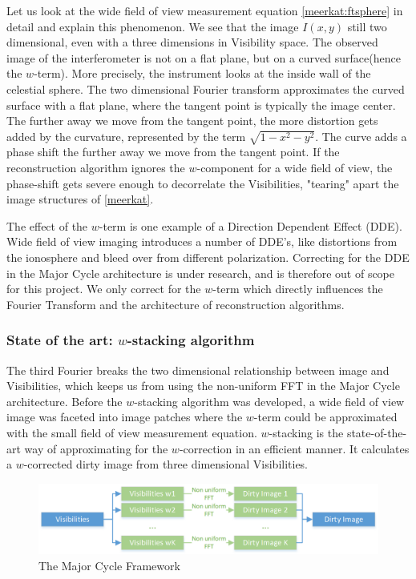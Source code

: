 Let us look at the wide field of view measurement equation \eqref{meerkat:ftsphere} in detail and explain this phenomenon. We see that the image $I(x,y)$ still two dimensional, even with a three dimensions in Visibility space. The observed image of the interferometer is not on a flat plane, but on a curved surface(hence the $w$-term)\cite{mcewen2011compressed}. More precisely, the instrument looks at the inside wall of the celestial sphere. The two dimensional Fourier transform approximates the curved surface with a flat plane, where the tangent point is typically the image center. The further away we move from the tangent point, the more distortion gets added by the curvature, represented by the term $\sqrt{1 - x^2 - y ^2}$. The curve adds a phase shift the further away we move from the tangent point. If the reconstruction algorithm ignores the $w$-component for a wide field of view, the phase-shift gets severe enough to decorrelate the Visibilities, "tearing" apart the image structures of \eqref{meerkat}.

The effect of the $w$-term is one example of a Direction Dependent Effect (DDE). Wide field of view imaging introduces a number of DDE's, like distortions from the ionosphere and bleed over from different polarization. Correcting for the DDE in the Major Cycle architecture is under research\cite{intema2009ionospheric}, and is therefore out of scope for this project. We only correct for the $w$-term which directly influences the Fourier Transform and the architecture of reconstruction algorithms. 


\subsubsection{State of the art: $w$-stacking algorithm}
The third Fourier breaks the two dimensional relationship between image and Visibilities, which keeps us from using the non-uniform FFT in the Major Cycle architecture. Before the $w$-stacking algorithm was developed, a wide field of view image was faceted into image patches where the $w$-term could be approximated with the small field of view measurement equation. $w$-stacking is the state-of-the-art way of approximating for the $w$-correction in an efficient manner. It calculates a $w$-corrected dirty image from three dimensional Visibilities.

\begin{figure}
	\centering
	\vspace{-10pt}
	\includegraphics[width=1.0\linewidth]{./chapters/03.challenges/w-stacks.png}
	\caption{The Major Cycle Framework}
	\label{meerkat:w-stacks}
	\vspace{-10pt}
\end{figure}

